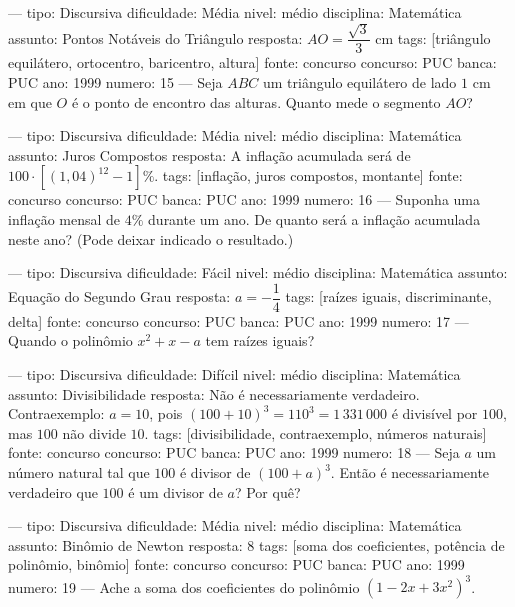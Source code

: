 ---
tipo: Discursiva
dificuldade: Média
nivel: médio
disciplina: Matemática
assunto: Pontos Notáveis do Triângulo
resposta: $AO = \dfrac{\sqrt{3}}{3}$ cm
tags: [triângulo equilátero, ortocentro, baricentro, altura]
fonte: concurso
concurso: PUC
banca: PUC
ano: 1999
numero: 15
---
\question
Seja $ABC$ um triângulo equilátero de lado $1$ cm em que $O$ é o ponto de encontro das alturas. Quanto mede o segmento $AO$?

---
tipo: Discursiva
dificuldade: Média
nivel: médio
disciplina: Matemática
assunto: Juros Compostos
resposta: A inflação acumulada será de $100 \cdot \left[(1{,}04)^{12} - 1\right]\%$.
tags: [inflação, juros compostos, montante]
fonte: concurso
concurso: PUC
banca: PUC
ano: 1999
numero: 16
---
\question
Suponha uma inflação mensal de $4\%$ durante um ano. De quanto será a inflação acumulada neste ano? (Pode deixar indicado o resultado.)

---
tipo: Discursiva
dificuldade: Fácil
nivel: médio
disciplina: Matemática
assunto: Equação do Segundo Grau
resposta: $a = -\dfrac{1}{4}$
tags: [raízes iguais, discriminante, delta]
fonte: concurso
concurso: PUC
banca: PUC
ano: 1999
numero: 17
---
\question
Quando o polinômio $x^2 + x - a$ tem raízes iguais?

---
tipo: Discursiva
dificuldade: Difícil
nivel: médio
disciplina: Matemática
assunto: Divisibilidade
resposta: Não é necessariamente verdadeiro. Contraexemplo: $a = 10$, pois $(100 + 10)^3 = 110^3 = 1\,331\,000$ é divisível por $100$, mas $100$ não divide $10$.
tags: [divisibilidade, contraexemplo, números naturais]
fonte: concurso
concurso: PUC
banca: PUC
ano: 1999
numero: 18
---
\question
Seja $a$ um número natural tal que $100$ é divisor de $(100+a)^3$. Então é necessariamente verdadeiro que $100$ é um divisor de $a$? Por quê?

---
tipo: Discursiva
dificuldade: Média
nivel: médio
disciplina: Matemática
assunto: Binômio de Newton
resposta: $8$
tags: [soma dos coeficientes, potência de polinômio, binômio]
fonte: concurso
concurso: PUC
banca: PUC
ano: 1999
numero: 19
---
\question
Ache a soma dos coeficientes do polinômio $(1 - 2x + 3x^2)^3$.
